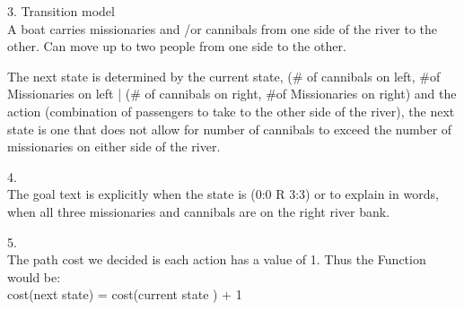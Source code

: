 \documentclass{article}
\begin{document}
3. Transition model\\
A boat carries missionaries and /or  cannibals from one side of the river to the other. Can move up to two people from one side to the other.

The next state is determined by the current state, (# of cannibals on left, #of Missionaries on left | (# of cannibals on right, #of Missionaries on right) and the action (combination of passengers to take to the other side of the river), the next state is one that does not allow for number of cannibals to exceed the number of missionaries on either side of the river.



4.\\
 The goal text is explicitly when the state is (0:0 R 3:3) or to explain in words, when all three missionaries and cannibals are on the right river bank.

5. \\
The path cost we decided is each action has a value of 1. Thus the Function would be:  \\ 
cost(next state) = cost(current state ) + 1 
\end{document}

